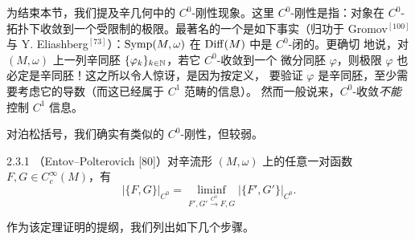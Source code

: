 为结束本节，我们提及辛几何中的 $C^0$-刚性现象。这里 $C^0$-刚性是指：对象在
$C^0$-拓扑下收敛到一个受限制的极限。最著名的一个是如下事实（归功于 Gromov$^{[100]}$
与 Y. Eliashberg$^{[73]}$）：$\operatorname{Symp}(M,\omega)$ 在 $\operatorname{Diff}(M)$ 中是 $C^0$-闭的。更确切
地说，对 $(M,\omega)$ 上一列辛同胚 $\{\varphi_k\}_{k\in\mathbb{N}}$，若它 $C^0$-收敛到一个
微分同胚 $\varphi$，则极限 $\varphi$ 也必定是辛同胚！这之所以令人惊讶，是因为按定义，
要验证 $\varphi$ 是辛同胚，至少需要考虑它的导数（而这已经属于 $C^1$ 范畴的信息）。
然而一般说来，$C^0$-收敛\emph{不能}控制 $C^1$ 信息。

对泊松括号，我们确实有类似的 $C^0$-刚性，但较弱。

\begin{wthm}{2.3.1}
（Entov--Polterovich [80]）对辛流形 $(M,\omega)$ 上的任意一对函数
$F,G\in C_c^\infty(M)$，有
\begin{equation}
  |\{F,G\}|_{C^0}
  =\liminf_{F',G'\xrightarrow{C^0}F,G}|\{F',G'\}|_{C^0}.
  \tag{2.14}
\end{equation}
\end{wthm}

作为该定理证明的提纲，我们列出如下几个步骤。

